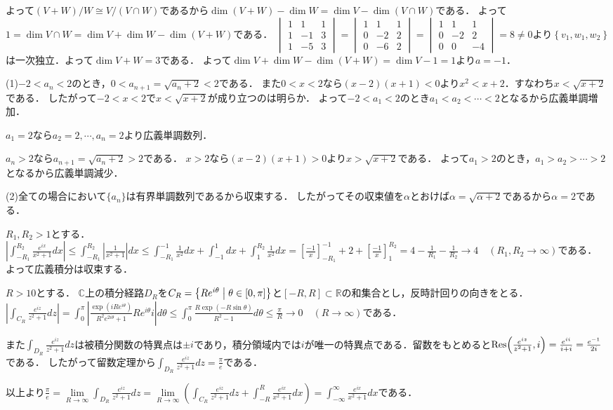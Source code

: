 \documentclass[
		book,
		head_space=20mm,
		foot_space=20mm,
		gutter=10mm,
		line_length=190mm
]{jlreq}
\begin{document}
よって$(V+W)/W\cong V/(V\cap W)$であるから$\dim (V+W)-\dim W=\dim V-\dim (V\cap W)$である．
よって$1=\dim V\cap W=\dim V +\dim W -\dim (V+ W)$である．
$\begin{vmatrix}
	1&1&1\\
	1&-1&3\\
	1&-5&3
\end{vmatrix}=\begin{vmatrix}
	1&1&1\\
	0&-2&2\\
	0&-6&2
\end{vmatrix}=\begin{vmatrix}
	1&1&1\\
	0&-2&2\\
	0&0&-4
\end{vmatrix}=8\neq 0$より$\left\{ v_1,w_1,w_2 \right\}$は一次独立．よって$\dim V+W=3$である．
よって$\dim V +\dim W -\dim (V+ W)=\dim V -1=1$より$a=-1$．

(1)$-2<a_n<2$のとき，$0<a_{n+1}=\sqrt{a_n+2}<2$である．
また$0<x<2$なら$(x-2)(x+1)<0$より$x^2<x+2$．すなわち$x<\sqrt{x+2}$である．
したがって$-2<x<2$で$x<\sqrt{x+2}$が成り立つのは明らか．
よって$-2<a_1<2$のとき$a_1<a_2<\cdots <2$となるから広義単調増加．

$a_1=2$なら$a_2=2,\cdots ,a_n=2$より広義単調数列．

$a_n>2$なら$a_{n+1}=\sqrt{a_n+2}>2$である．
$x>2$なら$(x-2)(x+1)>0$より$x>\sqrt{x+2}$である．
よって$a_1>2$のとき，$a_1>a_2>\cdots >2$となるから広義単調減少．

(2)全ての場合において$\{a_n\}$は有界単調数列であるから収束する．
したがってその収束値を$\alpha$とおけば$\alpha=\sqrt{\alpha+2}$であるから$\alpha=2$である．

$R_1,R_2>1$とする．
$\left| \int_{-R_1}^{R_2}\frac{e^{ix}}{x^2+1}dx \right|\le \int_{-R_1}^{R_2}\left| \frac{1}{x^2+1} \right|dx\le \int_{-R_1}^{-1} \frac{1}{x^2}dx+\int_{-1}^1 dx+\int_1^{R_2}\frac{1}{x^2}dx=\left[ \frac{-1}{x} \right]_{-R_1}^{-1}+2+\left[ \frac{-1}{x} \right]_{1}^{R_2}=4-\frac{1}{R_1}-\frac{1}{R_2}\rightarrow 4\quad(R_1,R_2\to \infty)$である．
よって広義積分は収束する．

$R>10$とする．
$\mathbb{C}$上の積分経路$D_R$を$C_R=\left\{ Re^{i\theta}\mathrel{}\middle|\mathrel{} \theta\in[0,\pi]\right\}$と$[-R,R]\subset \mathbb{R}$の和集合とし，反時計回りの向きをとる．
$\left| \int_{C_R}\frac{e^{iz}}{z^2+1}dz \right|=\int_{0}^\pi \left| \frac{\exp(iRe^{i\theta})}{R^2e^{2i\theta}+1} R e^{i\theta}i\right|d\theta\le \int_0^\pi \frac{R\exp(-R\sin \theta)}{R^2-1}d\theta\le \frac{\pi}{R}\rightarrow 0\quad(R\to \infty)$である．

また$\int_{D_R}\frac{e^{iz}}{z^2+1}dz$は被積分関数の特異点は$\pm i$であり，積分領域内では$i$が唯一の特異点である．留数をもとめると$\Res(\frac{e^{iz}}{z^2+1},i)=\frac{e^{ii}}{i+i}=\frac{e^{-1}}{2i}$である．
したがって留数定理から$\int_{D_R} \frac{e^{iz}}{z^2+1}dz=\frac{\pi}{e}$である．

以上より$\frac{\pi}{e}=\lim\limits_{R\to \infty}\int_{D_R} \frac{e^{iz}}{z^2+1}dz=\lim\limits_{R\to \infty}( \int_{C_R} \frac{e^{iz}}{z^2+1}dz+\int_{-R}^R \frac{e^{ix}}{x^2+1}dx)=\int_{-\infty}^\infty \frac{e^{ix}}{x^2+1}dx$である．
\end{document}
